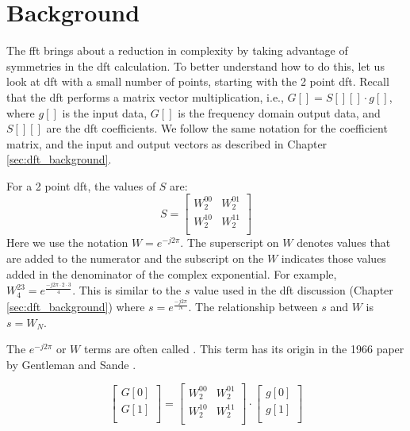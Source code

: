 \section{Background}

The \gls{fft} brings about a reduction in complexity by taking advantage of symmetries in the \gls{dft} calculation. To better understand how to do this, let us look at \gls{dft} with a small number of points, starting with the 2 point \gls{dft}.  Recall that the \gls{dft} performs a matrix vector multiplication, i.e., $G[] = S[][] \cdot g[]$, where $g[]$ is the input data, $G[]$ is the frequency domain output data, and $S[][]$ are the \gls{dft} coefficients. We follow the same notation for the coefficient matrix, and the input and output vectors as described in Chapter \ref{sec:dft_background}.

For a 2 point \gls{dft}, the values of $S$ are:
\begin{equation}
S =
 \begin{bmatrix}
  W^{0 0}_2 & W^{0 1}_2  \\
  W^{1 0}_2 & W^{1 1}_2 \\
 \end{bmatrix}
 \end{equation}
Here we use the notation $W = e^{-j 2 \pi}$. The superscript on $W$ denotes values that are added to the numerator and the subscript on the $W$ indicates those values added in the denominator of the complex exponential. For example, $W^{2 3}_4 = e^{\frac{-j 2 \pi \cdot 2 \cdot 3}{4}}$. This is similar to the $s$ value used in the \gls{dft} discussion (Chapter \ref{sec:dft_background}) where $s = e^{\frac{-j 2 \pi}{N}}$. The relationship between $s$ and $W$ is $s = W_N$.

\begin{aside}
The $e^{-j 2 \pi}$ or $W$ terms are often called . This term has its origin in the 1966 paper by Gentleman and Sande \cite{gentleman1966fast}.
\end{aside}

\begin{equation}
\begin{bmatrix} 
G[0] \\ 
G[1] \\
\end{bmatrix} = 
 \begin{bmatrix}
  W^{0 0}_2 & W^{0 1}_2  \\
  W^{1 0}_2 & W^{1 1}_2 \\
 \end{bmatrix}
 \cdot
  \begin{bmatrix}
  g[0] \\
  g[1]\\
\end{bmatrix}
\end{equation}

